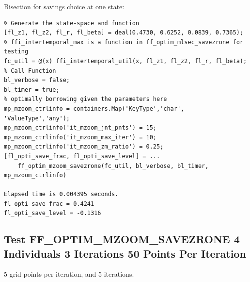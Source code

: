 \documentclass[
]{book}
\begin{document}
Bisection for savings choice at one state:

\begin{verbatim}
% Generate the state-space and function
[fl_z1, fl_z2, fl_r, fl_beta] = deal(0.4730, 0.6252, 0.0839, 0.7365);
% ffi_intertemporal_max is a function in ff_optim_mlsec_savezrone for testing
fc_util = @(x) ffi_intertemporal_util(x, fl_z1, fl_z2, fl_r, fl_beta);
% Call Function
bl_verbose = false;
bl_timer = true;
% optimally borrowing given the parameters here
mp_mzoom_ctrlinfo = containers.Map('KeyType','char', 'ValueType','any');
mp_mzoom_ctrlinfo('it_mzoom_jnt_pnts') = 15;
mp_mzoom_ctrlinfo('it_mzoom_max_iter') = 10;
mp_mzoom_ctrlinfo('it_mzoom_zm_ratio') = 0.25;
[fl_opti_save_frac, fl_opti_save_level] = ...
    ff_optim_mzoom_savezrone(fc_util, bl_verbose, bl_timer, mp_mzoom_ctrlinfo)

Elapsed time is 0.004395 seconds.
fl_opti_save_frac = 0.4241
fl_opti_save_level = -0.1316
\end{verbatim}

\hypertarget{test-ff_optim_mzoom_savezrone-4-individuals-3-iterations-50-points-per-iteration}{%
\subsection{Test FF\_OPTIM\_MZOOM\_SAVEZRONE 4 Individuals 3 Iterations 50 Points Per Iteration}\label{test-ff_optim_mzoom_savezrone-4-individuals-3-iterations-50-points-per-iteration}}

5 grid points per iteration, and 5 iterations.
\end{document}
